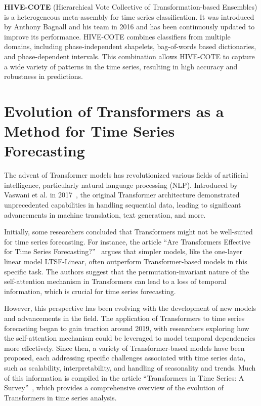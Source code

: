 \textbf{HIVE-COTE} (Hierarchical Vote Collective of Transformation-based Ensembles) is a heterogeneous meta-assembly for time series classification. It was introduced by Anthony Bagnall and his team in 2016 and has been continuously updated to improve its performance. HIVE-COTE combines classifiers from multiple domains, including phase-independent shapelets, bag-of-words based dictionaries, and phase-dependent intervals. This combination allows HIVE-COTE to capture a wide variety of patterns in the time series, resulting in high accuracy and robustness in predictions.




\section{Evolution of Transformers as a Method for Time Series Forecasting}

The advent of Transformer models has revolutionized various fields of artificial intelligence, particularly natural language processing (NLP). Introduced by Vaswani et al. in 2017~\cite{vaswani2023attention}, the original Transformer architecture demonstrated unprecedented capabilities in handling sequential data, leading to significant advancements in machine translation, text generation, and more. 

Initially, some researchers concluded that Transformers might not be well-suited for time series forecasting. For instance, the article “Are Transformers Effective for Time Series Forecasting?”~\cite{zeng2022transformerseffectivetimeseries} argues that simpler models, like the one-layer linear model LTSF-Linear, often outperform Transformer-based models in this specific task. The authors suggest that the permutation-invariant nature of the self-attention mechanism in Transformers can lead to a loss of temporal information, which is crucial for time series forecasting.

However, this perspective has been evolving with the development of new models and advancements in the field. The application of Transformers to time series forecasting began to gain traction around 2019, with researchers exploring how the self-attention mechanism could be leveraged to model temporal dependencies more effectively. Since then, a variety of Transformer-based models have been proposed, each addressing specific challenges associated with time series data, such as scalability, interpretability, and handling of seasonality and trends. Much of this information is compiled in the article “Transformers in Time Series: A Survey”~\cite{wen2023transformerstimeseriessurvey}, which provides a comprehensive overview of the evolution of Transformers in time series analysis.

